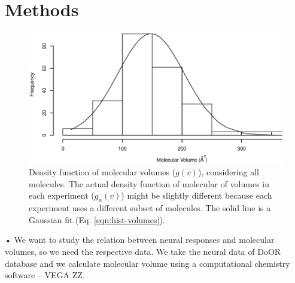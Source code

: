 \documentclass[11pt]{paper} %
\begin{document}
\section{Methods}
\begin{figure}
	\centering
	\includegraphics[width=0.5 \textwidth]{fig/hist-volumes}
	\caption{Density function of molecular volumes ($g(v)$), considering all molecules. 
		The actual density function of molecular of volumes in each experiment ($g_n(v)$) might be slightly different 
		because each experiment uses a different subset of molecules. 
		The solid line is a Gaussian fit (Eq. \ref{eqn:hist-volumes}).}
	\label{fig:hist-volumes}
\end{figure}•
We want to study the relation between neural responses and molecular volumes, so we need the respective data. 
We take the neural data of DoOR database \cite{DoOR2010} and we calculate molecular volume using a computational chemistry software -- VEGA ZZ. 
\end{document}
